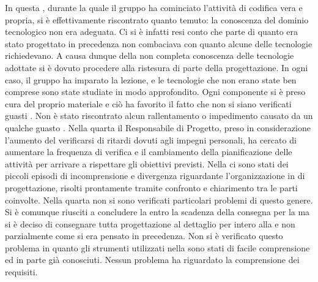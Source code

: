 		In questa , durante la quale il gruppo ha cominciato l'attività di codifica vera e propria, si è effettivamente riscontrato quanto temuto: la conoscenza del dominio tecnologico non era adeguata. Ci si è infatti resi conto che parte di quanto era stato progettato in precedenza non combaciava con quanto alcune delle tecnologie richiedevano. A causa dunque della non completa conoscenza delle tecnologie adottate si è dovuto procedere alla ristesura di parte della progettazione. In ogni caso, il gruppo ha imparato la lezione, e le tecnologie che non erano state ben comprese sono state studiate in modo approfondito.
		Ogni componente si è preso cura del proprio materiale e ciò ha favorito il fatto che non si siano verificati guasti . Non è stato riscontrato alcun rallentamento o impedimento causato da un qualche guasto .
		Nella quarta  il Responsabile di Progetto, preso in considerazione l’aumento del verificarsi di ritardi dovuti agli impegni personali, ha cercato di aumentare la frequenza di verifica e il cambiamento della pianificazione delle attività per arrivare a rispettare gli obiettivi previsti.
		Nella  ci sono stati dei piccoli episodi di incomprensione e divergenza riguardante l’organizzazione in  di progettazione, risolti prontamente tramite confronto e chiarimento tra le parti coinvolte.
		Nella quarta  non si sono verificati particolari problemi di questo genere. Si è comunque riusciti a concludere la  entro la scadenza della consegna per la  ma si è deciso di consegnare tutta progettazione al dettaglio per intero alla  e non parzialmente come si era pensato in precedenza.
		Non si è verificato questo problema in quanto gli strumenti utilizzati nella  sono stati di facile comprensione ed in parte già conosciuti.
		Nessun problema ha riguardato la comprensione dei requisiti.

